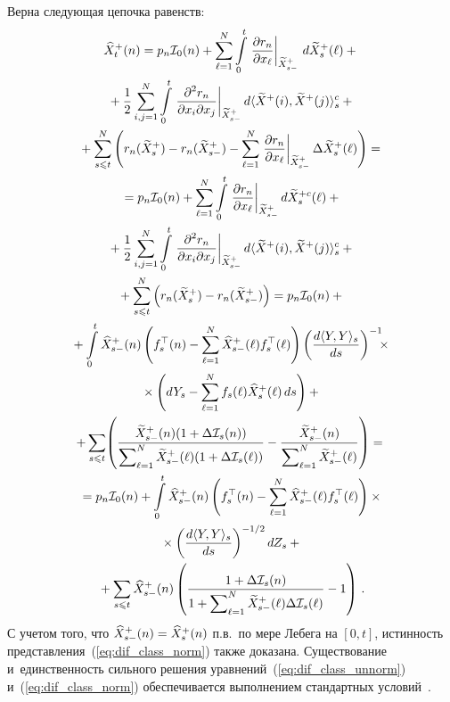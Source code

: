 \begin{multicols}{2}
{ Верна следующая цепочка равенств:
\begin{multline*}
 \widehat{X}^+_t(n) = p_n \mathcal{I}_0(n) + 
 \sum\limits_{\ell=1}^N \int\limits_0^t \left.
 \displaystyle\frac{\displaystyle \partial r_n\mathstrut}{\displaystyle \partial x_{\ell}\mathstrut}
 \right|_{\widetilde{X}^+_{s-}}\,d\widetilde{X}^+_{s}(\ell) +{}\\
 {}+
  \displaystyle\frac{\displaystyle 1\mathstrut}{\displaystyle 2\mathstrut} \sum\limits_{i,j=1}^N
 \int\limits_0^t \left.\displaystyle\frac{\displaystyle \partial^2 r_n\mathstrut}{\displaystyle \partial x_{i} \partial x_{j}\mathstrut}
 \right|_{\widetilde{X}^+_{s-}} d
 \langle \widetilde{X}^+(i),\widetilde{X}^+(j)\rangle_s^c +{} \\
 {} +
 \sum\limits_{s \leqslant t}^N  \left( 
 r_n(\widetilde{X}^+_{s})-r_n(\widetilde{X}^+_{s-})-\sum\limits_{\ell=1}^N\left.
 \displaystyle\frac{\displaystyle \partial r_n\mathstrut}{\displaystyle \partial x_{\ell}\mathstrut}\right|_{\widetilde{X}^+_{s-}} 
 \Delta \widetilde{X}^+_{s}(\ell)
 \right) = {}\\ 
 {}=
 p_n \mathcal{I}_0(n) + \sum\limits_{\ell=1}^N 
 \int\limits_0^t \left.\displaystyle\frac{\displaystyle \partial r_n\mathstrut}{\displaystyle \partial x_{\ell}\mathstrut}\right|_{\widetilde{X}^+_{s-}}d\widetilde{X}^{+c}_{s}(\ell) 
 + {}\\
 {}+\displaystyle\frac{\displaystyle 1\mathstrut}{\displaystyle 2\mathstrut} \sum\limits_{i,j=1}^N
 \int\limits_0^t \left.\displaystyle\frac{\displaystyle \partial^2 r_n\mathstrut}{\displaystyle \partial x_{i} \partial x_{j}\mathstrut}
 \right|_{\widetilde{X}^+_{s-}} d
 \langle \widetilde{X}^+(i),\widetilde{X}^+(j)\rangle_s^c + {}\\
 {} +
 \sum\limits_{s \leqslant t}^N  \left( 
 r_n(\widetilde{X}^+_{s})-r_n(\widetilde{X}^+_{s-})
 \right) =
 p_n\mathcal{I}_{0}(n) +{}\\
 {}+
  \int\limits_0^t \widehat{X}_{s-}^+(n)\left(
  f_s^{\top}(n) - \sum\limits_{\ell=1}^N \widehat{X}_{s-}^+(\ell)f_s^{\top}(\ell)
  \right)\left( \displaystyle\frac{\displaystyle d \langle Y,Y\rangle_s\mathstrut}{\displaystyle ds\mathstrut}\right)^{-1}\!\!\!\times{}\\
  {}\times
  \left(dY_s - \sum\limits_{\ell=1}^N f_s(\ell) \widehat{X}^+_s(\ell)\,ds \right)+{} \\
  +{} \sum\limits_{s \leqslant t} \!\left(
  \displaystyle\frac{\displaystyle \widetilde{X}_{s-}^+(n)(1+\Delta\mathcal{I}_{s}(n))\mathstrut}{\displaystyle \sum\nolimits_{\ell=1}^N\widetilde{X}_{s-}^+(\ell)(1+\Delta\mathcal{I}_{s}(\ell))\mathstrut} 
  - \displaystyle\frac{\displaystyle \widetilde{X}_{s-}^+(n)\mathstrut}{\displaystyle \sum\nolimits_{\ell=1}^N\widetilde{X}_{s-}^+(\ell)\mathstrut}
  \right) ={} \\ 
  {}=
  p_n\mathcal{I}_{0}(n) +
  \int\limits_0^t \widehat{X}_{s-}^+(n)\left(
  f_s^{\top}(n) - \sum\limits_{\ell=1}^N \widehat{X}_{s-}^+(\ell)f_s^{\top}(\ell)
  \right)\times{}\\
  {}\times\left( \displaystyle\frac{\displaystyle d \langle Y,Y\rangle_s\mathstrut}{\displaystyle ds\mathstrut}\right)^{-1/2}dZ_s+{} \\
{}  + \sum\limits_{s \leqslant t} \widehat{X}^+_{s-}(n)
  \left(
  \displaystyle\frac{\displaystyle 1+\Delta\mathcal{I}_{s}(n)\mathstrut}{\displaystyle 1+
  \sum\nolimits_{\ell=1}^N \widetilde{X}_{s-}^+(\ell)\Delta\mathcal{I}_{s}(\ell)\mathstrut} - 1
  \right)\,.
 \end{multline*}
 С учетом того, что $\widehat{X}_{s-}^+(n) \hm= \widehat{X}_{s}^+(n)$ п.в.\ 
 по мере Лебега на $[0,t]$, истинность представления~(\ref{eq:dif_class_norm}) 
 также доказана. Существование и~единственность сильного решения 
 уравнений~(\ref{eq:dif_class_unnorm}) и~(\ref{eq:dif_class_norm}) 
 обеспечивается выполнением стандартных условий~\cite{LS_86}.

}
\end{multicols}
